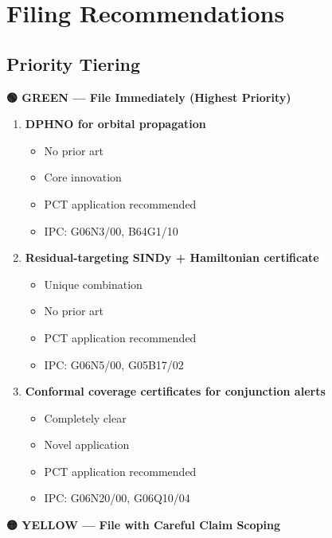 \documentclass[11pt,a4paper]{article}
\begin{document}
\newpage

\section{Filing Recommendations}

\subsection{Priority Tiering}

\textbf{🟢 GREEN — File Immediately (Highest Priority)}

\begin{enumerate}
\item \textbf{DPHNO for orbital propagation}
  \begin{itemize}
  \item No prior art
  \item Core innovation
  \item PCT application recommended
  \item IPC: G06N3/00, B64G1/10
  \end{itemize}

\item \textbf{Residual-targeting SINDy + Hamiltonian certificate}
  \begin{itemize}
  \item Unique combination
  \item No prior art
  \item PCT application recommended
  \item IPC: G06N5/00, G05B17/02
  \end{itemize}

\item \textbf{Conformal coverage certificates for conjunction alerts}
  \begin{itemize}
  \item Completely clear
  \item Novel application
  \item PCT application recommended
  \item IPC: G06N20/00, G06Q10/04
  \end{itemize}
\end{enumerate}

\textbf{🟡 YELLOW — File with Careful Claim Scoping}
\end{document}
